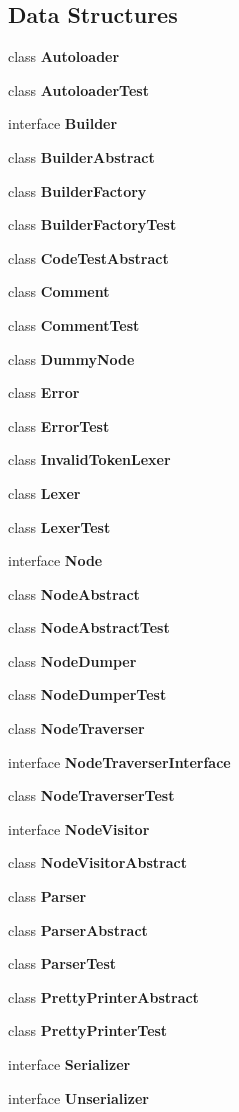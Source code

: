 \subsection*{Data Structures}
\begin{DoxyCompactItemize}
\item 
class {\bf Autoloader}
\item 
class {\bf Autoloader\+Test}
\item 
interface {\bf Builder}
\item 
class {\bf Builder\+Abstract}
\item 
class {\bf Builder\+Factory}
\item 
class {\bf Builder\+Factory\+Test}
\item 
class {\bf Code\+Test\+Abstract}
\item 
class {\bf Comment}
\item 
class {\bf Comment\+Test}
\item 
class {\bf Dummy\+Node}
\item 
class {\bf Error}
\item 
class {\bf Error\+Test}
\item 
class {\bf Invalid\+Token\+Lexer}
\item 
class {\bf Lexer}
\item 
class {\bf Lexer\+Test}
\item 
interface {\bf Node}
\item 
class {\bf Node\+Abstract}
\item 
class {\bf Node\+Abstract\+Test}
\item 
class {\bf Node\+Dumper}
\item 
class {\bf Node\+Dumper\+Test}
\item 
class {\bf Node\+Traverser}
\item 
interface {\bf Node\+Traverser\+Interface}
\item 
class {\bf Node\+Traverser\+Test}
\item 
interface {\bf Node\+Visitor}
\item 
class {\bf Node\+Visitor\+Abstract}
\item 
class {\bf Parser}
\item 
class {\bf Parser\+Abstract}
\item 
class {\bf Parser\+Test}
\item 
class {\bf Pretty\+Printer\+Abstract}
\item 
class {\bf Pretty\+Printer\+Test}
\item 
interface {\bf Serializer}
\item 
interface {\bf Unserializer}
\end{DoxyCompactItemize}
